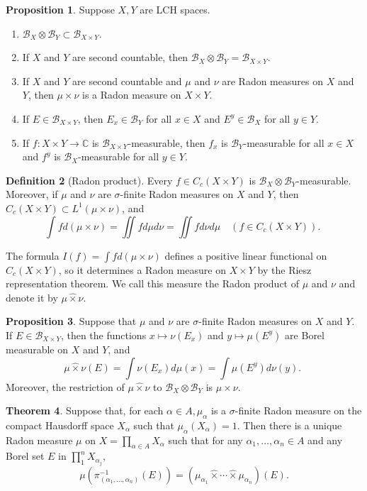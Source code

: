 \documentclass[12pt,a4paper]{book}
\newenvironment{enu}{\begin{enumerate}[(1)]}{\end{enumerate}}
\theoremstyle{definition}
\newtheorem{defn}{Definition}[section]
\newtheorem{theo}[defn]{Theorem}
\newtheorem{prop}[defn]{Proposition}
\begin{document}
\begin{prop}
    Suppose $X,Y$ are LCH spaces.
    \begin{enu}
        \item $\mathcal{B}_X \otimes \mathcal{B}_Y \subset \mathcal{B}_{X \times Y}$.
        \item If $X$ and $Y$ are second countable, then $\mathcal{B}_X \otimes \mathcal{B}_Y=\mathcal{B}_{X \times Y}$.
        \item If $X$ and $Y$ are second countable and $\mu$ and $\nu$ are Radon measures on $X$ and $Y$, then $\mu \times \nu$ is a Radon measure on $X \times Y$.
        \item If $E \in \mathcal{B}_{X \times Y}$, then $E_x \in \mathcal{B}_Y$ for all $x \in X$ and $E^y \in \mathcal{B}_X$ for all $y \in Y$.
        \item If $f: X \times Y \rightarrow \mathbb{C}$ is $\mathcal{B}_{X \times Y}$-measurable, then $f_x$ is $\mathcal{B}_Y$-measurable for all $x \in X$ and $f^y$ is $\mathcal{B}_X$-measurable for all $y \in Y$.
    \end{enu}
\end{prop}
\begin{defn}[Radon product]
    Every $f \in C_c(X \times Y)$ is $\mathcal{B}_X \otimes \mathcal{B}_Y$-measurable. Moreover, if $\mu$ and $\nu$ are $\sigma$-finite Radon measures on $X$ and $Y$,
    then $C_c(X \times Y) \subset L^1(\mu \times \nu)$, and
    $$
        \int f d(\mu \times \nu)=\iint f d \mu d \nu=\iint f d \nu d \mu \quad\left(f \in C_c(X \times Y)\right) \text {. }
    $$

    The formula $I(f)=\int f d(\mu \times \nu)$ defines a positive linear functional on $C_c(X \times Y)$,
    so it determines a Radon measure on $X \times Y$ by the Riesz representation theorem. We call this measure the Radon product of $\mu$ and $\nu$ and denote it by $\mu \widehat{\times} \nu$.
\end{defn}
\begin{prop}
    Suppose that $\mu$ and $\nu$ are $\sigma$-finite Radon measures on $X$ and $Y$.
    If $E \in \mathcal{B}_{X \times Y}$, then the functions $x \mapsto \nu\left(E_x\right)$ and $y \mapsto \mu\left(E^y\right)$ are Borel measurable on $X$ and $Y$, and
    $$
        \mu \widehat{\times} \nu(E)=\int \nu\left(E_x\right) d \mu(x)=\int \mu\left(E^y\right) d \nu(y) \text {. }
    $$
    Moreover, the restriction of $\mu \hat{\times} \nu$ to $\mathcal{B}_X \otimes \mathcal{B}_Y$ is $\mu \times \nu$.
\end{prop}
\begin{theo}
    Suppose that, for each $\alpha \in A, \mu_\alpha$ is a $\sigma$-finite 
    Radon measure on the compact Hausdorff space $X_\alpha$ such that $\mu_\alpha\left(X_\alpha\right)=1$. Then there is a unique Radon measure $\mu$ on $X=\prod_{\alpha \in A} X_\alpha$ such that for any $\alpha_1, \ldots, \alpha_n \in A$ and any Borel set $E$ in $\prod_1^n X_{\alpha_j}$,
    $$
        \mu\left(\pi_{\left(\alpha_1, \ldots, \alpha_n\right)}^{-1}(E)\right)=\left(\mu_{\alpha_1} \widehat{\times} \cdots \widehat{\times} \mu_{\alpha_n}\right)(E) .
    $$
    \label{theorem: infinite Radon product}
\end{theo}
\end{document}
